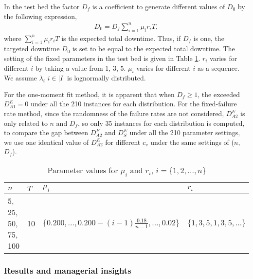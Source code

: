 \documentclass[preprint,12pt]{elsarticle}
\begin{document}
 In the test bed the factor $D_{f}$ is a coefficient to generate different values of $D_{0}$ by the following expression,
 \begin{eqnarray}
 D_{0} = D_{f}\sum_{i=1}^{n}{\mu_{i} r_{i} T}, \label{D0}
\end{eqnarray}
where $\sum_{i=1}^{n}{\mu_{i} r_{i} T}$ is the expected total downtime. Thus, if $D_{f}$ is one, the targeted downtime $D_0$ is set to be equal to the expected total downtime. The setting of the fixed parameters in the test bed is given in Table \ref{tab:testbedmur}. $r_{i}$ varies for different $i$ by taking a value from {1, 3, 5}. $\mu_{i}$ varies for different $i$ as a sequence. We assume $\lambda_{i}$ $i \in \rvert I \lvert$ is lognormally distributed.

For the one-moment fit method, it is apparent that when $D_{f} \geq 1$, the exceeded $D^{E}_{A1} = 0$ under all the 210 instances for each distribution. For the fixed-failure rate method, since the randomness of the failure rates are not considered, $D^{E}_{A2}$ is only related to $n$ and $D_{f}$, so only 35 instances for each distribution is computed, to compare the gap between $D^{E}_{A2}$ and $D^{E}_{S}$ under all the 210 parameter settings, we use one identical value of $D^{E}_{A2}$ for different $c_{v}$ under the same settings of ($n$, $D_{f}$).

\begin{table}[htbp]
\small
  \centering
  \caption{Parameter values for $\mu_{i}$ and $r_{i}$, $i=\{1,2,...,n\}$}
    \begin{tabular}{llll}
    \toprule
    $n$ & $T$ & $\mu_{i}$ &  $r_{i}$\\
    \midrule
    5, 25, 50, 75, 100   &10& $\{0.200,...,0.200-(i-1)\frac{0.18}{n-1},...,0.02\}$ &$\{1,3,5,1,3,5,...\}$\\
    \bottomrule
    \end{tabular}%
  \label{tab:testbedmur}%
\end{table}

\subsubsection{Results and managerial insights}
\end{document}
